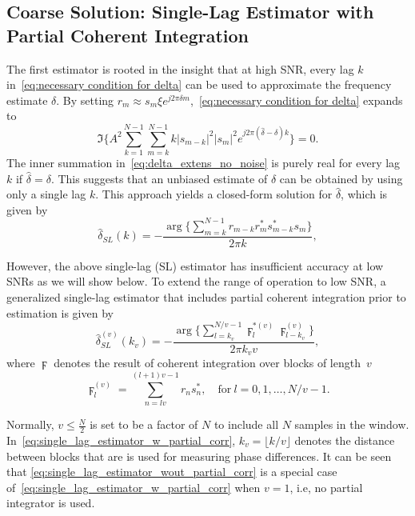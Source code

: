 \subsection{Coarse Solution: Single-Lag Estimator with Partial
  Coherent Integration}

The first estimator is rooted in the insight that at high SNR,
every lag $k$ in~\eqref{eq:necessary condition for delta}
can be used to approximate the frequency estimate $\delta$.
By setting $r_m\approx s_m\xi e^{j2\pi\delta m}$,~\eqref{eq:necessary condition for delta} expands to
\begin{equation}
  \label{eq:delta_extens_no_noise}
  \Im\bigg\{A^2\sum_{k=1}^{N-1}\sum_{m=k}^{N-1}k|s_{m-k}|^2|s_m|^2e^{j2\pi (\hat{\delta}-\delta)k}\bigg\}=0.
  \end{equation}
The inner summation in~\eqref{eq:delta_extens_no_noise} is purely real for every lag $k$ if $\hat{\delta}=\delta$.
This suggests that an unbiased estimate of $\delta$ can be obtained by
using only a single lag $k$.
This approach yields
a closed-form solution for $\hat{\delta}$, which is given by
\begin{equation}
  \label{eq:single_lag_estimator_wout_partial_corr}
  \hat{\delta}_{SL}(k)=-\frac{\arg\big\{\sum_{m=k}^{N-1}r_{m-k}r_m^*s_{m-k}^*s_m\big\}}{2\pi k},
\end{equation}

However, the above single-lag (SL) estimator has insufficient
accuracy at low SNRs as we will show below.
To extend the range of operation to low SNR,
a generalized single-lag estimator that includes partial coherent integration
prior to estimation is given by
\begin{equation}
  \label{eq:single_lag_estimator_w_partial_corr}
  \hat{\delta}_{SL}^{(v)}(k_v)=-\frac{\arg\big\{\sum_{l=k_v}^{N/v-1}\digamma_l^{*(v)}\digamma_{l-k_v}^{(v)}\big\}}{2\pi k_vv},
\end{equation}
where $\digamma$ denotes the result of coherent integration over
blocks of  length~$v$
\begin{equation}
  \label{eq:coherent_integrator}
  \digamma_l^{(v)}=\sum_{n=lv}^{(l+1)v-1}r_ns_n^*, \quad \text{for}~l=0,1,\ldots,N/v{-}1.
\end{equation}

Normally, $v \leq \frac{N}{2}$ is set to be a factor of $N$ to include
all $N$ samples in the window.
In~\eqref{eq:single_lag_estimator_w_partial_corr}, $k_v=\lfloor k/v \rfloor$ denotes
the distance between blocks that are is used for measuring phase differences.
It can be seen that 
\eqref{eq:single_lag_estimator_wout_partial_corr} is a special case of~\eqref{eq:single_lag_estimator_w_partial_corr}
when $v=1$, i.e,  no partial integrator is used.

